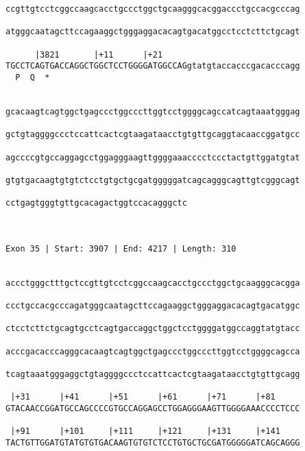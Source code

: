 \documentclass{article}
\begin{document}
\begin{Verbatim}
ccgttgtcctcggccaagcacctgccctggctgcaagggcacggaccctgccacgcccag
                                                            
atgggcaatagcttccagaaggctgggaggacacagtgacatggcctcctcttctgcagt
                                                            
      |3821       |+11      |+21                            
TGCCTCAGTGACCAGGCTGGCTCCTGGGGATGGCCAGgtatgtaccacccgacacccagg
  P  Q  *                                                   
                                                            
  
gcacaagtcagtggctgagccctggcccttggtcctggggcagccatcagtaaatgggag
                                                            
gctgtaggggccctccattcactcgtaagataacctgtgttgcaggtacaaccggatgcc
                                                            
agccccgtgccaggagcctggagggaagttggggaaacccctccctactgttggatgtat
                                                            
gtgtgacaagtgtgtctcctgtgctgcgatgggggatcagcagggcagttgtcgggcagt
                                                            
cctgagtgggtgttgcacagactggtccacagggctc
                                     
                                     
 
Exon 35 | Start: 3907 | End: 4217 | Length: 310


accctgggctttgctccgttgtcctcggccaagcacctgccctggctgcaagggcacgga
                                                            
ccctgccacgcccagatgggcaatagcttccagaaggctgggaggacacagtgacatggc
                                                            
ctcctcttctgcagtgcctcagtgaccaggctggctcctggggatggccaggtatgtacc
                                                            
acccgacacccagggcacaagtcagtggctgagccctggcccttggtcctggggcagcca
                                                            
tcagtaaatgggaggctgtaggggccctccattcactcgtaagataacctgtgttgcagg
                                                            
 |+31      |+41      |+51      |+61      |+71      |+81     
GTACAACCGGATGCCAGCCCCGTGCCAGGAGCCTGGAGGGAAGTTGGGGAAACCCCTCCC
                                                            
 |+91      |+101     |+111     |+121     |+131     |+141    
TACTGTTGGATGTATGTGTGACAAGTGTGTCTCCTGTGCTGCGATGGGGGATCAGCAGGG
                                                            

\end{Verbatim}
\end{document}
